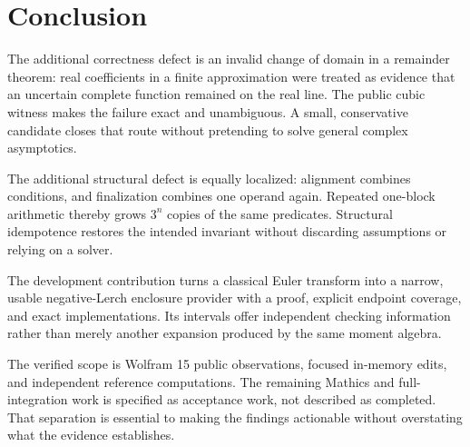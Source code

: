 \documentclass[11pt,a4paper]{article}
\begin{document}
\section{Conclusion}
The additional correctness defect is an invalid change of domain in a remainder theorem: real coefficients in a finite approximation were treated as evidence that an uncertain complete function remained on the real line. The public cubic witness makes the failure exact and unambiguous. A small, conservative candidate closes that route without pretending to solve general complex asymptotics.

The additional structural defect is equally localized: alignment combines conditions, and finalization combines one operand again. Repeated one-block arithmetic thereby grows $3^n$ copies of the same predicates. Structural idempotence restores the intended invariant without discarding assumptions or relying on a solver.

The development contribution turns a classical Euler transform into a narrow, usable negative-Lerch enclosure provider with a proof, explicit endpoint coverage, and exact implementations. Its intervals offer independent checking information rather than merely another expansion produced by the same moment algebra.

The verified scope is Wolfram 15 public observations, focused in-memory edits, and independent reference computations. The remaining Mathics and full-integration work is specified as acceptance work, not described as completed. That separation is essential to making the findings actionable without overstating what the evidence establishes.

\appendix
\end{document}
